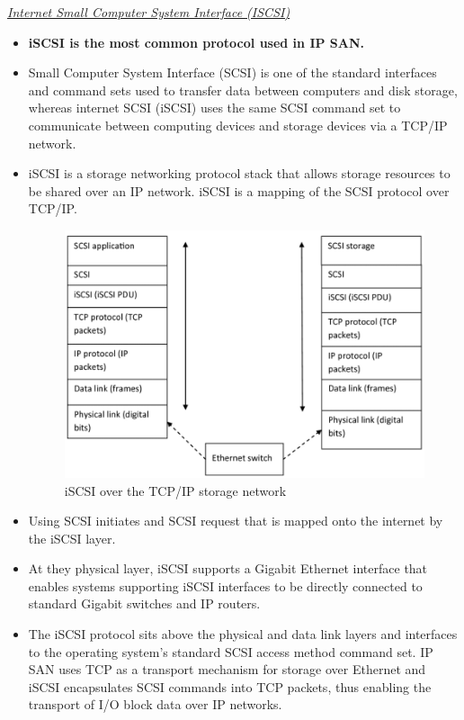 \documentclass[a4paper, 12pt]{article}
\begin{document}
\textit{\underline{Internet Small Computer System Interface (ISCSI)}}
\begin{itemize}
\item
\textbf{iSCSI is the most common protocol used in IP SAN.}
\item
Small Computer System Interface (SCSI) is one of the standard interfaces and command sets used to transfer data between computers and disk storage, whereas internet SCSI (iSCSI) uses the same SCSI command set to communicate between computing devices and storage devices via a TCP/IP network.
\item
iSCSI is a storage networking protocol stack that allows storage resources to be shared over an IP network. iSCSI is a mapping of the SCSI protocol over TCP/IP.

\begin{figure}[H]
	\centering
	\includegraphics[width=\linewidth]{iscsi_tcpip.png}
  	\caption{iSCSI over the TCP/IP storage network}
	\label{fig:iscsi_tcpip}
\end{figure}

\item
Using SCSI initiates and SCSI request that is mapped onto the internet by the iSCSI layer.
\item
At they physical layer, iSCSI supports a Gigabit Ethernet interface that enables systems supporting iSCSI interfaces to be directly connected to standard Gigabit switches and IP routers.
\item
The iSCSI protocol sits above the physical and data link layers and interfaces to the operating system's standard SCSI access method command set. IP SAN uses TCP as a transport mechanism for storage over Ethernet and iSCSI encapsulates SCSI commands into TCP packets, thus enabling the transport of I/O block data over IP networks.


\end{itemize}
\end{document}
